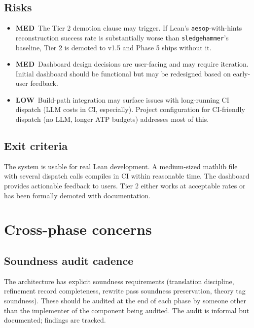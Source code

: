 \documentclass[11pt,letterpaper]{article}
\newcommand{\medrisk}{\textcolor{riskmed}{\textbf{MED}}}
\newcommand{\lowrisk}{\textcolor{risklow}{\textbf{LOW}}}
\begin{document}
\subsection{Risks}

\begin{itemize}
  \item \medrisk\ The Tier 2 demotion clause may trigger. If Lean's
        \texttt{aesop}-with-hints reconstruction success rate is
        substantially worse than \texttt{sledgehammer}'s baseline, Tier 2
        is demoted to v1.5 and Phase 5 ships without it.
  \item \medrisk\ Dashboard design decisions are user-facing and may
        require iteration. Initial dashboard should be functional but
        may be redesigned based on early-user feedback.
  \item \lowrisk\ Build-path integration may surface issues with
        long-running CI dispatch (LLM costs in CI, especially). Project
        configuration for CI-friendly dispatch (no LLM, longer ATP
        budgets) addresses most of this.
\end{itemize}

\subsection{Exit criteria}

The system is usable for real Lean development. A medium-sized mathlib
file with several dispatch calls compiles in CI within reasonable
time. The dashboard provides actionable feedback to users. Tier 2
either works at acceptable rates or has been formally demoted with
documentation.

\section{Cross-phase concerns}

\subsection{Soundness audit cadence}

The architecture has explicit soundness requirements (translation
discipline, refinement record completeness, rewrite pass soundness
preservation, theory tag soundness). These should be audited at the
end of each phase by someone other than the implementer of the
component being audited. The audit is informal but documented;
findings are tracked.
\end{document}
